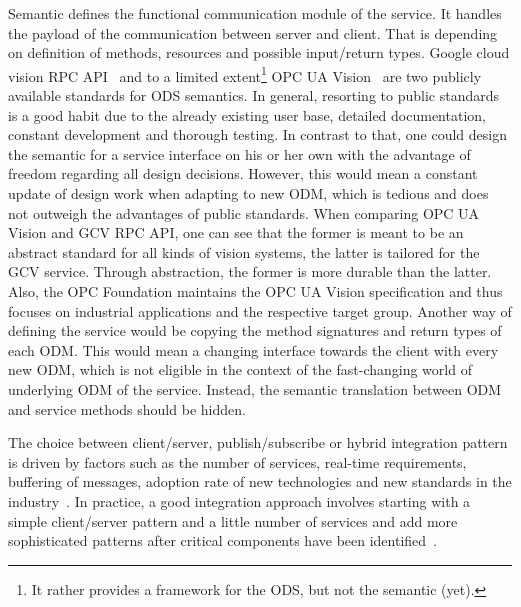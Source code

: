 \begin{table}[ht]
\begin{center}
\begin{minipage}{\textwidth}
      \end{minipage}
    \end{center}
\end{table}%

Semantic defines the functional communication module of the service. It handles the payload of the communication between server and client. That is depending on definition of methods, resources and possible input/return types. Google cloud vision RPC API~\cite{Google-Cloud-Documentation2018Cloud2018} and to a limited extent\footnote{It rather provides a framework for the ODS, but not the semantic (yet).} OPC UA Vision~\cite{VDMA2018OPC40100-1:2018-11} are two publicly available standards for ODS semantics. In general, resorting to public standards is a good habit due to the already existing user base, detailed documentation, constant development and thorough testing. In contrast to that, one could design the semantic for a service interface on his or her own with the advantage of freedom regarding all design decisions. However, this would mean a constant update of design work when adapting to new ODM, which is tedious and does not outweigh the advantages of public standards. When comparing OPC UA Vision and GCV RPC API, one can see that the former is meant to be an abstract standard for all kinds of vision systems, the latter is tailored for the GCV service. Through abstraction, the former is more durable than the latter. Also, the OPC Foundation maintains the OPC UA Vision specification and thus focuses on industrial applications and the respective target group. Another way of defining the service would be copying the method signatures and return types of each ODM. This would mean a changing interface towards the client with every new ODM, which is not eligible in the context of the fast-changing world of underlying ODM of the service. Instead, the semantic translation between ODM and service methods should be hidden. 

The choice between client/server, publish/subscribe or hybrid integration pattern is driven by factors such as the number of services, real-time requirements, buffering of messages, adoption rate of new technologies and new standards in the industry~\cite{Bianco2007EvaluatingArchitecture}. In practice, a good integration approach involves starting with a simple client/server pattern and a little number of services and add more sophisticated patterns after critical components have been identified~\cite{Newman2015BuildingMicroservices}.

